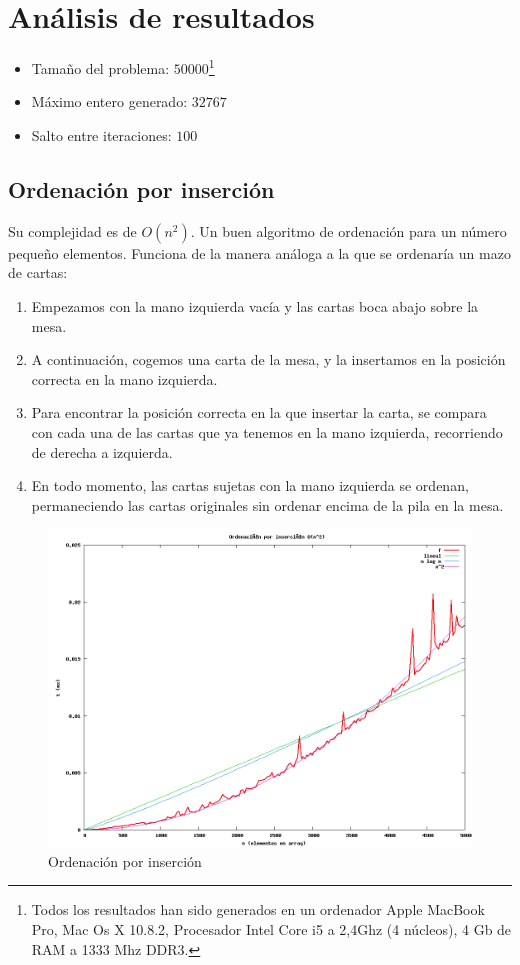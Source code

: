 \section{Análisis de resultados}
\begin{itemize}
\item Tamaño del problema: $50000$\footnote{Todos los resultados han sido generados en un ordenador Apple MacBook Pro, Mac Os X 10.8.2, Procesador Intel Core i5 a 2,4Ghz (4 núcleos), 4 Gb de RAM a 1333 Mhz DDR3.}
\item Máximo entero generado: $32767$
\item Salto entre iteraciones: $100$
\end{itemize}

\subsection{Ordenación por inserción \cite{CORMEN}}
Su complejidad es de $O(n^2)$. Un buen algoritmo de ordenación para un número pequeño elementos. Funciona de la manera análoga a la que se ordenaría un mazo de cartas:
\begin{enumerate}
	\item Empezamos con la mano izquierda vacía y las cartas boca abajo sobre la mesa.
	\item A continuación, cogemos una carta de la mesa, y la insertamos en la posición correcta 			en la mano izquierda.
	\item Para encontrar la posición correcta en la que insertar la carta, se compara con cada 			una de las cartas que ya tenemos en la mano izquierda, recorriendo de derecha a 					izquierda.
\item En todo momento, las cartas sujetas con la mano izquierda se ordenan, permaneciendo las 			cartas originales sin ordenar encima de la pila en la mesa.
\end{enumerate}

	\begin{figure}[H]
  		\centering
   		 \includegraphics[width=1.0\textwidth]{insertion-sort.png}
  		\caption{Ordenación por inserción}
 			 \label{fig:insertion}
		\end{figure}

